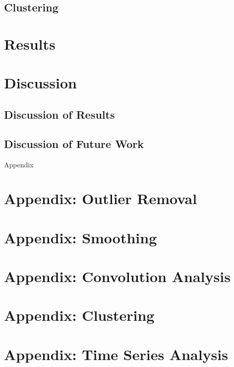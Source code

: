 \documentclass[11pt]{article}
\begin{document}
	\subsection{Clustering}
	
		
		
\section{Results} \label{results}
		
	

\section{Discussion} \label{discussion}
	
	\subsection{Discussion of Results}
		
		
		
	\subsection{Discussion of Future Work}
	
		
		

\pagebreak

\begin{center}
\Huge{Appendix} \appendix
\end{center}


\section{Appendix: Outlier Removal} \label{app_outliers}



\section{Appendix: Smoothing} \label{app_smoothing}



\section{Appendix: Convolution Analysis} \label{app_convolution}



\section{Appendix: Clustering} \label{app_clustering}



\section{Appendix: Time Series Analysis} \label{app_time}




\end{document}

